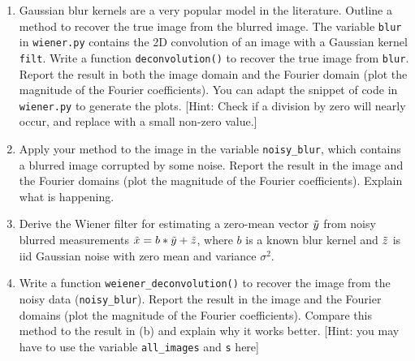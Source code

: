 \documentclass[12pt,twoside]{article}
\begin{document}
\begin{enumerate}
 \begin{enumerate}
 \item Gaussian blur kernels are a very popular model in the literature.  Outline a method to recover the true image from the blurred image. The variable \texttt{blur} in \texttt{wiener.py} contains the 2D convolution of an image with a Gaussian kernel \texttt{filt}. Write a function \texttt{deconvolution()} to recover the true image from \texttt{blur}. Report the result in both the image domain and the Fourier domain (plot the magnitude of the Fourier coefficients). You can adapt the snippet of code in \texttt{wiener.py} to generate the plots. [Hint: Check if a division by zero will nearly occur, and replace with a small non-zero value.]
 \item Apply your method to the image in the variable \texttt{noisy\_blur}, which contains a blurred image corrupted by some noise.  Report the result in the image and the Fourier domains (plot the magnitude of the Fourier coefficients). Explain what is happening.
  \item Derive the Wiener filter for estimating a zero-mean vector $\tilde{  y }$ from noisy blurred measurements $\tilde{  x } = b \ast \tilde{  y } + \tilde{ z }$, where $b$ is a known blur kernel and $\tilde{ z }$ is iid Gaussian noise with zero mean and variance $\sigma^2$. 
  \item Write a function \texttt{weiener\_deconvolution()} to recover the image from the noisy data (\texttt{noisy\_blur}). Report the result in the image and the Fourier domains (plot the magnitude of the Fourier coefficients). Compare this method to the result in (b) and explain why it works better. [Hint: you may have to use the variable \texttt{all\_images} and \texttt{s} here]
  \end{enumerate}

 \end{enumerate}
\end{document}
